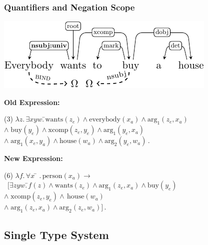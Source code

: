 \documentclass[mathserif,12pt]{beamer}
\renewcommand{\land}{\wedge}
\newcommand{\lspace}{.\,}
\begin{document}
\begin{frame}
\frametitle{Quantifiers and Negation Scope}
\centering
\includegraphics[trim=0em 0em 0em 0em,clip=true,scale=1.1]{figures/everybody-wants-buy-house-enhanced-with-univ-crop}

\raggedright \textbf{Old Expression:}
\begin{tabbing}
(3) $\lambda z \lspace \exists xyw \lspace$\=$\mathrm{wants}(z_e) \land \mathrm{everybody}(x_a) \land \mathrm{arg_1}(z_e, x_a) $\\
\>$\land\; \mathrm{buy}(y_e) \land \mathrm{xcomp}(z_e, y_e) \land \mathrm{arg_1}(y_e, x_a)$\\
\>$\land \; \mathrm{arg_1}(x_e,y_a) \land \mathrm{house}(w_a) \land \mathrm{arg_2}(y_e, w_a)$\,.
\end{tabbing}

\raggedright \textbf{New Expression:}
\begin{tabbing}
(6) $\lambda f \lspace \forall x$ \= $\lspace \mathrm{person}(x_a) \rightarrow$\\\
\>$[\exists zyw \lspace$\=$f(z) \land \mathrm{wants}(z_e) \land \mathrm{arg_1}(z_e, x_a)\land \mathrm{buy}(y_e)$\\
\>\>$\land\; \mathrm{xcomp}(z_e, y_e) \land\, \mathrm{house}(w_a)$\\
\>\>$\land\; \mathrm{arg_1}(z_e, x_a) \land \mathrm{arg_2}(z_e, w_a)]$\,.
\end{tabbing}

\end{frame} 



\subsection{Single Type System}
\end{document}
